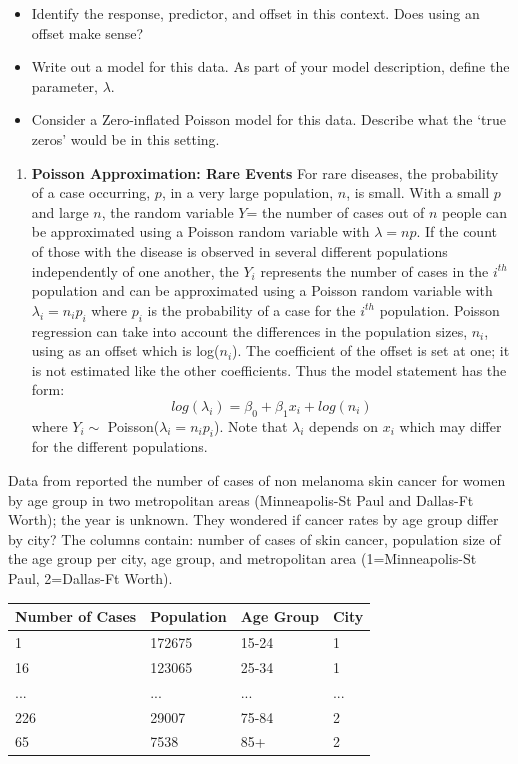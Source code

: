 \documentclass[
]{krantz}
\providecommand{\tightlist}{%
  \setlength{\itemsep}{0pt}\setlength{\parskip}{0pt}}
\begin{document}
\begin{itemize}
\tightlist
\item
  Identify the response, predictor, and offset in this context. Does using an offset make sense?
\item
  Write out a model for this data. As part of your model description, define the parameter, \(\lambda\).
\item
  Consider a Zero-inflated Poisson model for this data. Describe what the `true zeros' would be in this setting.
\end{itemize}

\begin{enumerate}
\def\labelenumi{\arabic{enumi}.}
\setcounter{enumi}{15}
\tightlist
\item
  \textbf{Poisson Approximation: Rare Events} For rare diseases, the probability of a case occurring, \(p\), in a very large population, \(n\), is small. With a small \(p\) and large \(n\), the random variable \(Y\)= the number of cases out of \(n\) people can be approximated using a Poisson random variable with \(\lambda = np\). If the count of those with the disease is observed in several different populations independently of one another, the \(Y_i\) represents the number of cases in the \(i^{th}\) population and can be approximated using a Poisson random variable with \(\lambda_i=n_ip_i\) where \(p_i\) is the probability of a case for the \(i^{th}\) population. Poisson regression can take into account the differences in the population sizes, \(n_i\), using as an offset which is log(\(n_i\)). The coefficient of the offset is set at one; it is not estimated like the other coefficients. Thus the model statement has the form:
  \[
  log(\lambda_i) = \beta_0+\beta_1x_i + log(n_i)
  \]
  where \(Y_i \sim\) Poisson(\(\lambda_i = n_i p_i\)). Note that \(\lambda_i\) depends on \(x_i\) which may differ for the different populations.
\end{enumerate}

Data from \citet{Scotto1974} reported the number of cases of non melanoma skin cancer for women by age group in two metropolitan areas (Minneapolis-St Paul and Dallas-Ft Worth); the year is unknown. They wondered if cancer rates by age group differ by city? The columns contain: number of cases of skin cancer, population size of the age group per city, age group, and metropolitan area (1=Minneapolis-St Paul, 2=Dallas-Ft Worth).

\begin{tabular}{l|l|l|l}
\hline
Number of Cases & Population & Age Group & City\\
\hline
1 & 172675 & 15-24 & 1\\
\hline
16 & 123065 & 25-34 & 1\\
\hline
... & ... & ... & ...\\
\hline
226 & 29007 & 75-84 & 2\\
\hline
65 & 7538 & 85+ & 2\\
\hline
\end{tabular}
\end{document}
